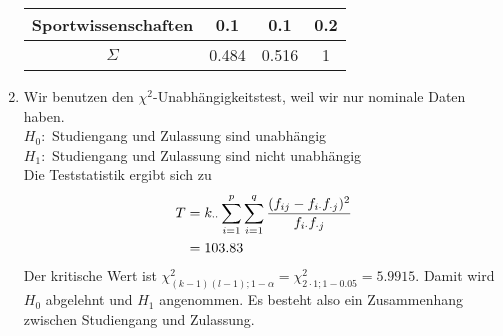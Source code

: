 \documentclass{article}
\begin{document}
\begin{enumerate}[label=(\alph*)]
\begin{center}
\begin{tabular}{c|cc|c}
				Sportwissenschaften & 0.1 & 0.1 & 0.2 \\
				\hline
				$\Sigma$ & 0.484 & 0.516 & 1
			\end{tabular}
		\end{center}
		\item Wir benutzen den $\chi^2$-Unabhängigkeitstest, weil wir nur nominale Daten haben. \\
		$H_0:$ Studiengang und Zulassung sind unabhängig \\
		$H_1:$ Studiengang und Zulassung sind nicht unabhängig \\
		Die Teststatistik ergibt sich zu
		\begin{align}
			T &= k_{\cdot\cdot}\sum_{i=1}^p\sum_{i=1}^q \frac{(f_{ij}-f_{i\cdot}f_{\cdot j})^2}{f_{i\cdot}f_{\cdot j}} \notag \\
			&= 103.83 \notag
		\end{align}
		Der kritische Wert ist $\chi^2_{(k-1)(l-1);1-\alpha} = \chi^2_{2\cdot 1;1-0.05} = 5.9915$. Damit wird $H_0$ abgelehnt und $H_1$ angenommen. Es besteht also ein Zusammenhang zwischen Studiengang und Zulassung.
	\end{enumerate}
	
\end{document}
